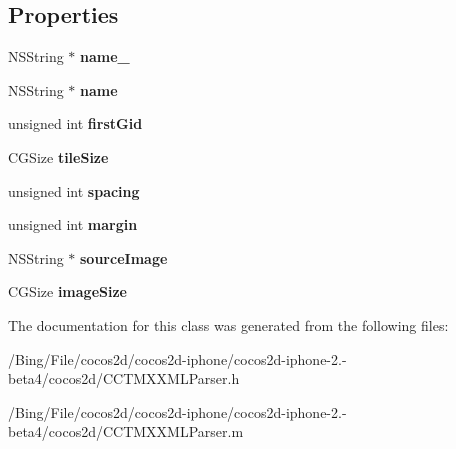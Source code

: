 \subsection*{Properties}
\begin{DoxyCompactItemize}
\item 
\hypertarget{interface_c_c_t_m_x_tileset_info_a682e04b2db84cdd17679c5884718a5e1}{N\-S\-String $\ast$ {\bfseries name\-\_\-}}\label{interface_c_c_t_m_x_tileset_info_a682e04b2db84cdd17679c5884718a5e1}

\item 
\hypertarget{interface_c_c_t_m_x_tileset_info_a777b102e06ce4cebbd8d450c2f54d977}{N\-S\-String $\ast$ {\bfseries name}}\label{interface_c_c_t_m_x_tileset_info_a777b102e06ce4cebbd8d450c2f54d977}

\item 
\hypertarget{interface_c_c_t_m_x_tileset_info_af0e298eaafd20ae24fe55f1e8d452370}{unsigned int {\bfseries first\-Gid}}\label{interface_c_c_t_m_x_tileset_info_af0e298eaafd20ae24fe55f1e8d452370}

\item 
\hypertarget{interface_c_c_t_m_x_tileset_info_a46d68673ce187cdf05754e7c82ce3f0c}{C\-G\-Size {\bfseries tile\-Size}}\label{interface_c_c_t_m_x_tileset_info_a46d68673ce187cdf05754e7c82ce3f0c}

\item 
\hypertarget{interface_c_c_t_m_x_tileset_info_ae069b057947e2770ab2228dd4fb75737}{unsigned int {\bfseries spacing}}\label{interface_c_c_t_m_x_tileset_info_ae069b057947e2770ab2228dd4fb75737}

\item 
\hypertarget{interface_c_c_t_m_x_tileset_info_afcce185eecc5d1ac3ff85847d6b8e5f1}{unsigned int {\bfseries margin}}\label{interface_c_c_t_m_x_tileset_info_afcce185eecc5d1ac3ff85847d6b8e5f1}

\item 
\hypertarget{interface_c_c_t_m_x_tileset_info_aa0d6294e797b306dfc0e29143b1eb012}{N\-S\-String $\ast$ {\bfseries source\-Image}}\label{interface_c_c_t_m_x_tileset_info_aa0d6294e797b306dfc0e29143b1eb012}

\item 
\hypertarget{interface_c_c_t_m_x_tileset_info_a5bb93dd4257886c7067a0f14ff8cf1be}{C\-G\-Size {\bfseries image\-Size}}\label{interface_c_c_t_m_x_tileset_info_a5bb93dd4257886c7067a0f14ff8cf1be}

\end{DoxyCompactItemize}


The documentation for this class was generated from the following files\-:\begin{DoxyCompactItemize}
\item 
/\-Bing/\-File/cocos2d/cocos2d-\/iphone/cocos2d-\/iphone-\/2.-\/beta4/cocos2d/C\-C\-T\-M\-X\-X\-M\-L\-Parser.\-h\item 
/\-Bing/\-File/cocos2d/cocos2d-\/iphone/cocos2d-\/iphone-\/2.-\/beta4/cocos2d/C\-C\-T\-M\-X\-X\-M\-L\-Parser.\-m\end{DoxyCompactItemize}
